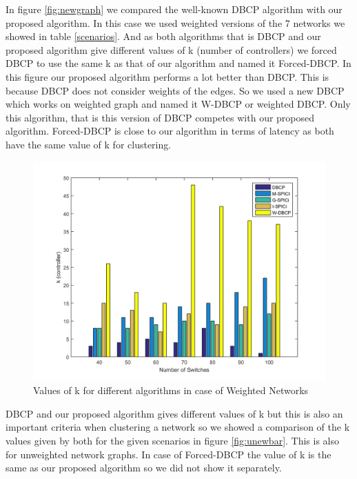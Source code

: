 \documentclass[10pt]{extarticle}
\begin{document}
	In figure \ref{fig:newgraph} we compared the well-known DBCP algorithm with our proposed algorithm. In this case we used weighted versions of the 7 networks we showed in table \ref{scenarios}. And as both algorithms that is DBCP and our proposed algorithm give different values of k (number of controllers) we forced DBCP to use the same k as that of our algorithm and named it Forced-DBCP. In this figure our proposed algorithm performs a lot better than DBCP. This is because DBCP does not consider weights of the edges. So we used a new DBCP which works on weighted graph and named it W-DBCP or weighted DBCP. Only this algorithm, that is this version of DBCP competes with our proposed algorithm. Forced-DBCP is close to our algorithm in terms of latency as both have the same value of k for clustering.

	\begin{figure}
		\includegraphics[width=\linewidth]{wnewbar.png}
		\caption{Values of k for different algorithms in case of Weighted Networks}
		\label{fig:newbar}
	\end{figure}
	DBCP and our proposed algorithm gives different values of k but this is also an important criteria when clustering a network so we showed a comparison of the k values given by both for the given scenarios in figure \ref{fig:unewbar}. This is also for unweighted network graphs. In case of Forced-DBCP the value of k is the same as our proposed algorithm so we did not show it separately.
	
	
	
\end{document}
